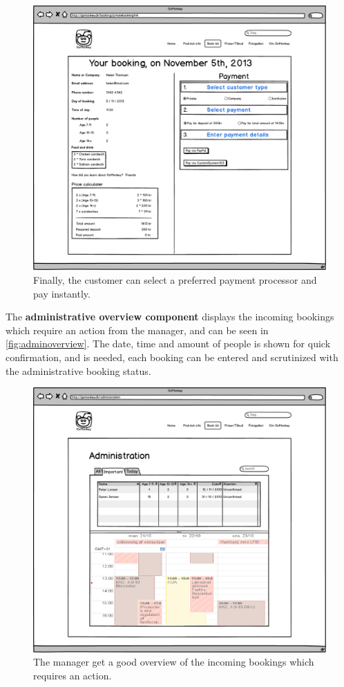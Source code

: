 \begin{figure}[htbp]
    \centering
        \includegraphics[width=.8\textwidth]{figures/mockup/booking_payment_3.png}
	    \caption{Finally, the customer can select a preferred payment processor and pay instantly.}
        \label{fig:bookstatus3}
\end{figure}

The \textbf{administrative overview component} displays the incoming bookings which require an 
action from the manager, and can be seen in \autoref{fig:adminoverview}. The 
date, time and amount of people is shown for quick confirmation, and is needed,
each booking can be entered and scrutinized with the administrative booking status.

\begin{figure}[htbp]
    \centering
        \includegraphics[width=.8\textwidth]{figures/mockup/overview_important.png}
	    \caption{The manager get a good overview of the incoming bookings which requires an action.}
        \label{fig:adminoverview}
\end{figure}

